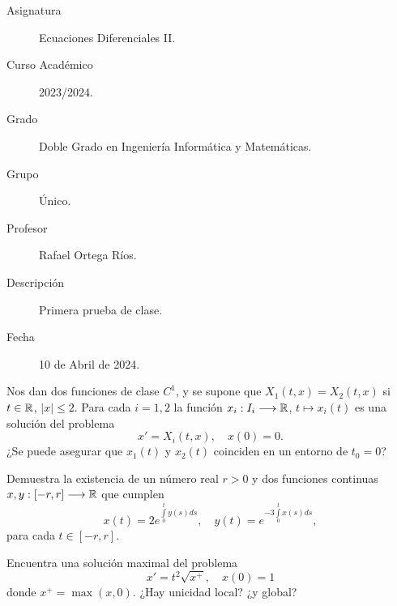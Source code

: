 \documentclass[12pt]{article}
\begin{document}

    
    

    \begin{description}
        \item[Asignatura] Ecuaciones Diferenciales II.
        \item[Curso Académico] 2023/2024.
        \item[Grado] Doble Grado en Ingeniería Informática y Matemáticas.
        \item[Grupo] Único.
        \item[Profesor] Rafael Ortega Ríos.
        \item[Descripción] Primera prueba de clase.
        \item[Fecha] 10 de Abril de 2024.
    \end{description}
    \newpage


    
    \begin{ejercicio}
        Nos dan dos funciones de clase $C^1$,
        y se supone que $X_1(t,x) = X_2(t,x)$ si $t \in \mathbb{R}$, $|x| \leq 2$. Para cada $i = 1,2$ la función $x_i : I_i \longrightarrow \mathbb{R}$, $t \longmapsto x_i(t)$ es una solución del problema
        \[
        x' = X_i(t,x), \quad x(0) = 0.
        \]
        ¿Se puede asegurar que $x_1(t)$ y $x_2(t)$ coinciden en un entorno de $t_0 = 0$?
    \end{ejercicio}

    \begin{ejercicio}
        Demuestra la existencia de un número real $r > 0$ y dos funciones continuas $x, y : \left[-r,r\right] \longrightarrow \mathbb{R}$ que cumplen
        \[
        x(t) = 2e^{\int\limits_0^t y(s)ds}, \quad y(t) = e^{-3\int\limits_0^t x(s)ds},
        \]
        para cada $t \in \left[-r,r\right]$.
    \end{ejercicio}

    \begin{ejercicio}
        Encuentra una solución maximal del problema
        \[
        x' = t^2\sqrt{x^+}, \quad x(0) = 1
        \]
        donde $x^+ = \max(x,0)$. ¿Hay unicidad local? ¿y global?
    \end{ejercicio}
\end{document}
